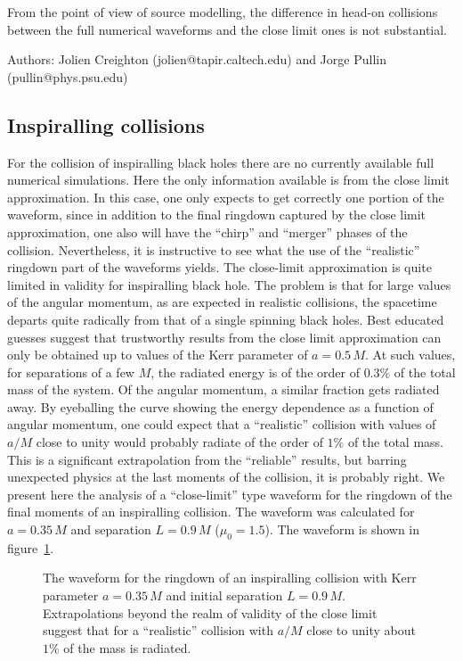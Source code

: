 {}From the point of view of source modelling, the difference in head-on
collisions between the full numerical waveforms and the close limit ones
is not substantial.

\begin{description}
\item{Authors:}  Jolien Creighton (jolien@tapir.caltech.edu)
    and Jorge Pullin (pullin@phys.psu.edu)
\end{description}

\clearpage
\subsection{Inspiralling collisions}

For the collision of inspiralling black holes there are no currently
available full numerical simulations. Here the only information
available is from the close limit approximation. In this case, one only
expects to get correctly one portion of the waveform, since in addition
to the final ringdown captured by the close limit approximation, one
also will have the ``chirp'' and ``merger'' phases of the collision.
Nevertheless, it is instructive to see what the use of the ``realistic''
ringdown part of the waveforms yields. The close-limit approximation is
quite limited in validity for inspiralling black hole. The problem is
that for large values of the angular momentum, as are expected in
realistic collisions, the spacetime departs quite radically from that of
a single spinning black holes. Best educated guesses suggest that
trustworthy results from the close limit approximation can only be
obtained up to values of the Kerr parameter of $a=0.5\,M$. At such values,
for separations of a few $M$, the radiated energy is of the order of
$0.3\%$ of the total mass of the system. Of the angular momentum, a
similar fraction gets radiated away. By eyeballing the curve showing the
energy dependence as a function of angular momentum, one could expect
that a ``realistic'' collision with values of $a/M$ close to unity would
probably radiate of the order of $1\%$ of the total mass. This is a
significant extrapolation from the ``reliable'' results, but barring
unexpected physics at the last moments of the collision, it is probably
right. We present here the analysis of a ``close-limit'' type waveform
for the ringdown of the final moments of an inspiralling collision. The
waveform was calculated for $a=0.35\,M$ and separation $L=0.9\,M$
($\mu_0=1.5$).
The waveform is shown in
figure~\ref{f:inspiral}.
\begin{figure}
\begin{center} 
\end{center}
\caption{\label{f:inspiral}%
The waveform for the ringdown of an inspiralling collision with
Kerr parameter $a=0.35\,M$ and initial separation $L=0.9\,M$.
Extrapolations beyond
the realm of validity of the close limit suggest that for a ``realistic''
collision with $a/M$ close to unity about $1\%$ of the mass is radiated.}
\end{figure}

